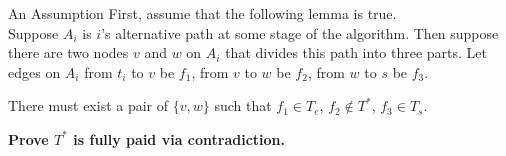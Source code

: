 \documentclass[11pt,aspectratio=169]{beamer}
\begin{document}
\begin{frame}{An Assumption}
First, assume that the following lemma is true. 
\vspace{10pt}\\
Suppose \(A_i\) is \(i\)'s alternative path at some stage of the algorithm. Then suppose there are two nodes \(v\) and \(w\) on \(A_i\) that divides this path into three parts. Let edges on \(A_i\) from \(t_i\) to \(v\) be \(f_1\), from \(v\) to \(w\) be \(f_2\), from \(w\) to \(s\) be \(f_3\).
\begin{lemma}
    There must exist a pair of \(\{v,w\}\) such that \(f_1 \in T_e\), \(f_2 \notin T^*\), \(f_3 \in T_s\).
\end{lemma}
\vspace{10pt}

\textbf{Prove $T^*$ is fully paid via contradiction.}
\end{frame}
\end{document}
